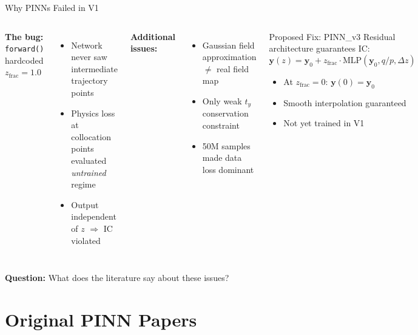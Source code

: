 \documentclass[aspectratio=169, 11pt]{beamer}
\newcommand{\vb}[1]{\bm{#1}}
\begin{document}
\begin{frame}{Why PINNs Failed in V1}
  \begin{columns}[T]
    \textbf{The bug:} \texttt{forward()} hardcoded $z_\text{frac}=1.0$
    \begin{itemize}
      \item Network never saw intermediate trajectory points
      \item Physics loss at collocation points evaluated \emph{untrained} regime
      \item Output independent of $z$ $\Rightarrow$ IC violated
    \end{itemize}

    \medskip
    \textbf{Additional issues:}
    \begin{itemize}
      \item Gaussian field approximation $\neq$ real field map
      \item Only weak $t_y$ conservation constraint
      \item 50M samples made data loss dominant
    \end{itemize}

    \begin{exampleblock}{Proposed Fix: PINN\_v3}
      Residual architecture guarantees IC:
      \[
        \vb{y}(z) = \vb{y}_0 + z_\text{frac} \cdot \text{MLP}(\vb{y}_0, q/p, \Delta z)
      \]
      \begin{itemize}
        \item At $z_\text{frac}=0$: $\vb{y}(0) = \vb{y}_0$ \checkmark
        \item Smooth interpolation guaranteed
        \item Not yet trained in V1
      \end{itemize}
    \end{exampleblock}
  \end{columns}

  \bigskip
  \centering
  \textcolor{lhcbblue}{\textbf{Question:} What does the literature say about these issues?}
\end{frame}

\section{Original PINN Papers}
\end{document}
